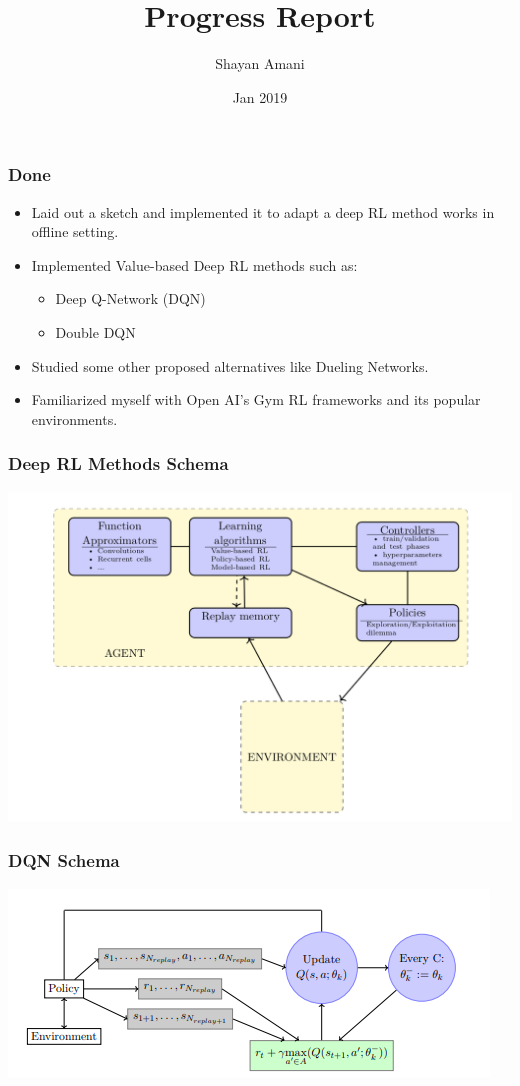 \documentclass{beamer}
\title{Progress Report}
\author{Shayan Amani\\}
\date{Jan 2019}
\institute{Department of Computer Science, University of New Hampshire}
\begin{document}
  \begin{frame}
    \titlepage
  \end{frame}


\begin{frame}
    \frametitle{Done}
    
    \begin{itemize}
        \item Laid out a sketch and implemented it to adapt a deep RL method works in offline setting. 
        \item Implemented Value-based Deep RL methods such as:
        \begin{itemize}
            \item Deep Q-Network (DQN) \cite{Mnih2015}
            \item Double DQN \cite{van2016a}
        \end{itemize}
        \item Studied some other proposed alternatives like Dueling Networks\cite{wang2015a}.
        \item Familiarized myself with Open AI's Gym RL frameworks and its popular environments.
    \end{itemize}
\end{frame}

\begin{frame}
    \frametitle{Deep RL Methods Schema}
    \includegraphics[width=1\columnwidth]{schema_deer.png}    
\end{frame}

\begin{frame}
    \frametitle{DQN Schema}
    \includegraphics[width=1\columnwidth]{dqn_schema.png}
\end{frame}
\end{document}
